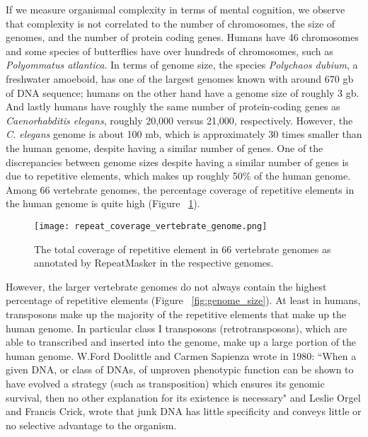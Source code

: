 If we measure organismal complexity in terms of mental cognition, we observe that complexity is not correlated to the number of chromosomes, the size of genomes, and the number of protein coding genes. Humans have 46 chromosomes and some species of butterflies have over hundreds of chromosomes, such as \textit{Polyommatus atlantica}. In terms of genome size, the species \textit{Polychaos dubium}, a freshwater amoeboid, has one of the largest genomes known with around 670 gb of DNA sequence; humans on the other hand have a genome size of roughly 3 gb. And lastly humans have roughly the same number of protein-coding genes as \textit{Caenorhabditis elegans}, roughly 20,000 versus 21,000, respectively. However, the \textit{C. elegans} genome is about 100 mb\cite{celegans1998sequencing}, which is approximately 30 times smaller than the human genome, despite having a similar number of genes. One of the discrepancies between genome sizes despite having a similar number of genes is due to repetitive elements, which makes up roughly 50\% of the human genome. Among 66 vertebrate genomes, the percentage coverage of repetitive elements in the human genome is quite high (Figure ~\ref{fig:repeat_coverage_vertebrate_genome}).

\begin{figure}[!ht]
   \centering
   \texttt{[image: repeat\_coverage\_vertebrate\_genome.png]}
   \caption[Coverage of repetitive elements in vertebrate genomes]{The total coverage of repetitive element in 66 vertebrate genomes as annotated by RepeatMasker in the respective genomes\cite{tang2014repcoverage}.}
   \label{fig:repeat_coverage_vertebrate_genome}
\end{figure}

However, the larger vertebrate genomes do not always contain the highest percentage of repetitive elements (Figure ~\ref{fig:genome_size}). At least in humans, transposons make up the majority of the repetitive elements that make up the human genome. In particular class I transposons (retrotransposons), which are able to transcribed and inserted into the genome, make up a large portion of the human genome. W.Ford Doolittle and Carmen Sapienza wrote in 1980\cite{doolittle1980selfish}: ``When a given DNA, or class of DNAs, of unproven phenotypic function can be shown to have evolved a strategy (such as transposition) which ensures its genomic survival, then no other explanation for its existence is necessary" and Leslie Orgel and Francis Crick, wrote that junk DNA has little specificity and conveys little or no selective advantage to the organism\cite{orgel1980selfish}.


